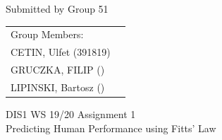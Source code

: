 \documentclass[a4paper,12pt,oneside]{scrreprt}
\begin{document}
\begin{center}
	Submitted by Group 51
	
	\bigskip
	
	\begin{tabular}{ll}
	Group Members: \\
	CETIN, Ulfet (391819) \\
	GRUCZKA, FILIP () \\
	LIPINSKI, Bartosz () \\
	\end{tabular}

	\bigskip
	
	DIS1 WS 19/20 Assignment 1\\
	Predicting Human Performance using Fitts' Law
	
\end{center}



\bigskip 
\end{document}
